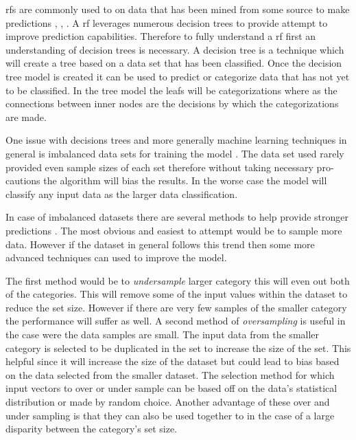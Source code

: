 \gls{rf}s are commonly used to on data that has been mined from some source to make predictions \cite{Alam2013}, \cite{Granitto2007}, \cite{Yu2011}. A \gls{rf} leverages numerous decision trees to provide attempt to improve prediction capabilities. Therefore to fully understand a \gls{rf} first an understanding of decision trees is necessary. A decision tree is a technique which will create a tree based on a data set that has been classified. Once the decision tree model is created it can be used to predict or categorize data that has not yet to be classified. In the tree model the leafs will be categorizations where as the connections between inner nodes are the decisions by which the categorizations are made.

One issue with decisions trees and more generally machine learning techniques in general is imbalanced data sets for training the model \cite{Khoshgoftaar2007}. The data set used rarely provided even sample sizes of each set therefore without taking necessary pro-cautions the algorithm will bias the results. In the worse case the model will classify any input data as the larger data classification.

In case of imbalanced datasets there are several methods to help provide stronger predictions \cite{Khoshgoftaar2007}. The most obvious and easiest to attempt would be to sample more data. However if the dataset in general follows this trend then some more advanced techniques can used to improve the model.

 
The first method would be to \textit{undersample} larger category this will even out both of the categories. This will remove some of the input values within the dataset to reduce the set size. However if there are very few samples of the smaller category the performance will suffer as well. A second method of \textit{oversampling} is useful in the case were the data samples are small. The input data from the smaller category is selected to be duplicated in the set to increase the size of the set. This helpful since it will increase the size of the dataset but could lead to bias based on the data selected from the smaller dataset. The selection method for which input vectors to over or under sample can be based off on the data's statistical distribution or made by random choice. Another advantage of these over and under sampling is that they can also be used together to in the case of a large disparity between the category's set size. 

